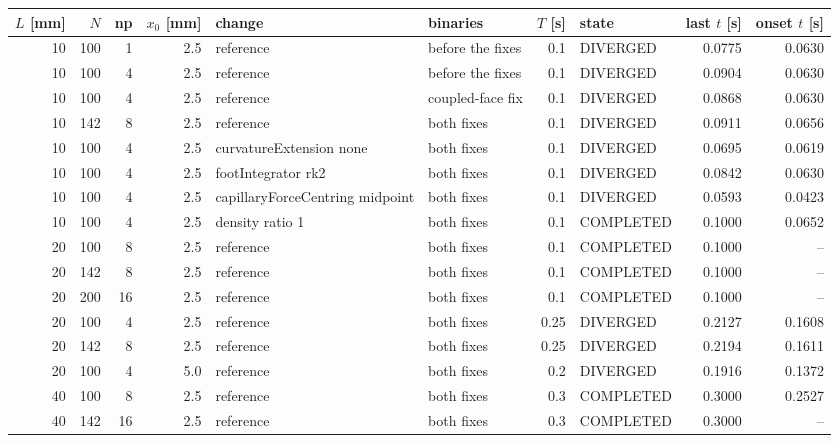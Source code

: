 \begin{tabular}{@{}rrrrllrlrr@{}}
  \toprule
  $L$ [mm] & $N$ & np & $x_0$ [mm] & change & binaries & $T$ [s] & state & last $t$ [s] & onset $t$ [s]\\
  \midrule
10 & 100 & 1 & 2.5 & reference & before the fixes & 0.1 & DIVERGED & 0.0775 & 0.0630\\
10 & 100 & 4 & 2.5 & reference & before the fixes & 0.1 & DIVERGED & 0.0904 & 0.0630\\
10 & 100 & 4 & 2.5 & reference & coupled-face fix & 0.1 & DIVERGED & 0.0868 & 0.0630\\
10 & 142 & 8 & 2.5 & reference & both fixes & 0.1 & DIVERGED & 0.0911 & 0.0656\\
10 & 100 & 4 & 2.5 & curvatureExtension none & both fixes & 0.1 & DIVERGED & 0.0695 & 0.0619\\
10 & 100 & 4 & 2.5 & footIntegrator rk2 & both fixes & 0.1 & DIVERGED & 0.0842 & 0.0630\\
10 & 100 & 4 & 2.5 & capillaryForceCentring midpoint & both fixes & 0.1 & DIVERGED & 0.0593 & 0.0423\\
10 & 100 & 4 & 2.5 & density ratio 1 & both fixes & 0.1 & COMPLETED & 0.1000 & 0.0652\\
20 & 100 & 8 & 2.5 & reference & both fixes & 0.1 & COMPLETED & 0.1000 & --\\
20 & 142 & 8 & 2.5 & reference & both fixes & 0.1 & COMPLETED & 0.1000 & --\\
20 & 200 & 16 & 2.5 & reference & both fixes & 0.1 & COMPLETED & 0.1000 & --\\
20 & 100 & 4 & 2.5 & reference & both fixes & 0.25 & DIVERGED & 0.2127 & 0.1608\\
20 & 142 & 8 & 2.5 & reference & both fixes & 0.25 & DIVERGED & 0.2194 & 0.1611\\
20 & 100 & 4 & 5.0 & reference & both fixes & 0.2 & DIVERGED & 0.1916 & 0.1372\\
40 & 100 & 8 & 2.5 & reference & both fixes & 0.3 & COMPLETED & 0.3000 & 0.2527\\
40 & 142 & 16 & 2.5 & reference & both fixes & 0.3 & COMPLETED & 0.3000 & --\\
  \bottomrule
\end{tabular}

